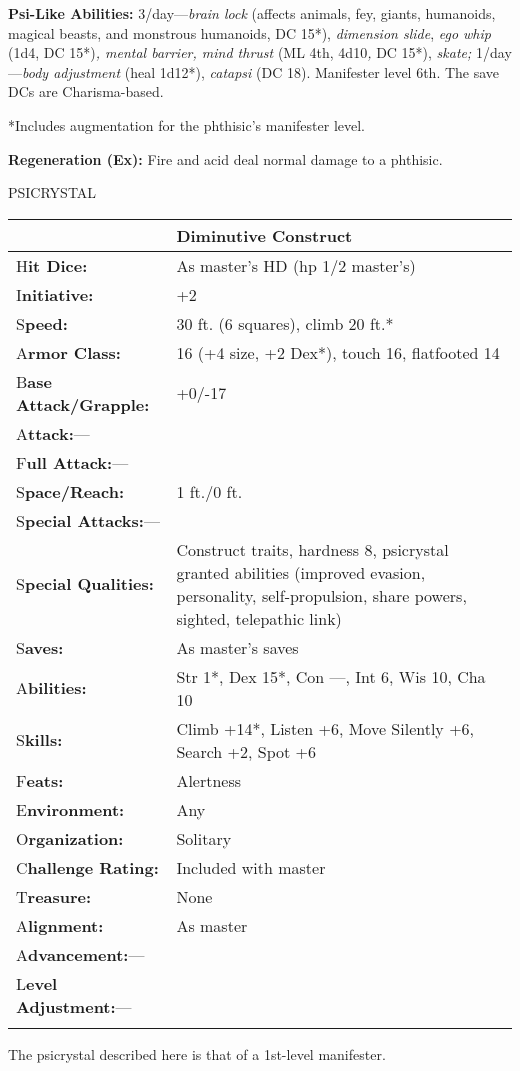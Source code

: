 \documentclass{article}
\begin{document}
\textbf{Psi-Like Abilities:} 3/day---\textit{brain lock }(affects animals, fey, 
giants, humanoids, magical beasts, and monstrous humanoids, DC 15*), \textit{dimension 
slide}, \textit{ego whip }(1d4, DC 15*)\textit{, mental barrier, mind thrust }(ML 
4th, 4d10\textit{, }DC 15*), \textit{skate; }1/day---\textit{body adjustment }(heal 
1d12*), \textit{catapsi }(DC 18). Manifester level 6th. The save DCs are Charisma-based.

*Includes augmentation for the phthisic's manifester level.

\textbf{Regeneration (Ex): }Fire and acid deal normal damage to a phthisic.

\vspace{12pt}
{\LARGE{}PSICRYSTAL}

\begin{tabular}{|>{\raggedright}p{74pt}|>{\raggedright}p{251pt}|}
\hline
  & Diminutive Construct\tabularnewline
\hline
H\textbf{it Dice:} & As master's HD (hp 1/2 master's)\tabularnewline
\hline
I\textbf{nitiative:} & +2\tabularnewline
\hline
S\textbf{peed:} & 30 ft. (6 squares), climb 20 ft.*\tabularnewline
\hline
A\textbf{rmor Class:} & 16 (+4 size, +2 Dex*), touch 16, flatfooted 14\tabularnewline
\hline
B\textbf{ase Attack/Grapple:} & +0/-17\tabularnewline
\hline
A\textbf{ttack:}--- & \tabularnewline
\hline
F\textbf{ull Attack:}--- & \tabularnewline
\hline
S\textbf{pace/Reach:} & 1 ft./0 ft.\tabularnewline
\hline
S\textbf{pecial Attacks:}--- & \tabularnewline
\hline
S\textbf{pecial Qualities:} & Construct traits, hardness 8, psicrystal granted 
abilities (improved evasion, personality, self-propulsion, share powers, sighted, 
telepathic link)\tabularnewline
\hline
S\textbf{aves:} & As master's saves\tabularnewline
\hline
A\textbf{bilities:} & Str 1*, Dex 15*, Con ---, Int 6, Wis 10, Cha 10\tabularnewline
\hline
S\textbf{kills:} & Climb +14*, Listen +6, Move Silently +6, Search +2, Spot +6\tabularnewline
\hline
F\textbf{eats:} & Alertness\tabularnewline
\hline
E\textbf{nvironment:} & Any\tabularnewline
\hline
O\textbf{rganization:} & Solitary\tabularnewline
\hline
C\textbf{hallenge Rating:} & Included with master\tabularnewline
\hline
T\textbf{reasure:} & None\tabularnewline
\hline
A\textbf{lignment:} & As master\tabularnewline
\hline
A\textbf{dvancement:}--- & \tabularnewline
\hline
L\textbf{evel Adjustment:}--- & \tabularnewline
\hline
\multicolumn{2}{|p{326pt}|}{*With self-propulsion ability activated.}\tabularnewline
\hline
\end{tabular}

The psicrystal described here is that of a 1st-level manifester.
\end{document}
